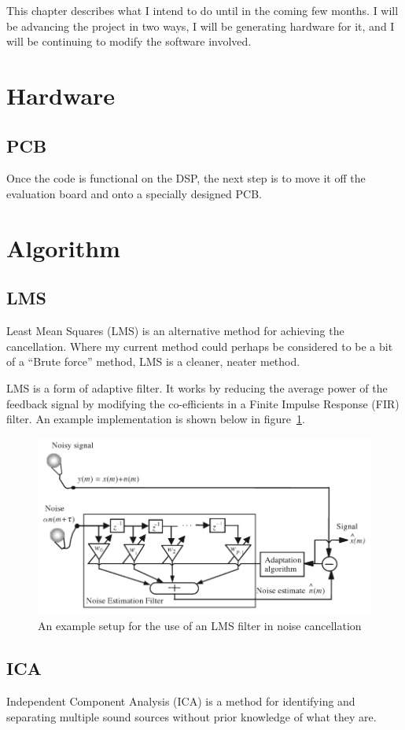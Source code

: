 This chapter describes what I intend to do until in the coming few months.
I will be advancing the project in two ways, I will be generating hardware for it, and I will be continuing to modify the software involved.

\section{Hardware}
\subsection{PCB}
Once the code is functional on the DSP, the next step is to move it off the evaluation board and onto a specially designed PCB.

\section{Algorithm}
\subsection{LMS}
Least Mean Squares (LMS) is an alternative method for achieving the cancellation.
Where my current method could perhaps be considered to be a bit of a ``Brute force'' method, LMS is a cleaner, neater method.

LMS is a form of adaptive filter.
It works by reducing the average power of the feedback signal by modifying the co-efficients in a Finite Impulse Response (FIR) filter.
An example implementation is shown below in figure~\ref{fig:lmsfilter}.

\begin{figure}[H]
	\centering
	\includegraphics[width=\textwidth]{./img/lmsfilter.png}
	\caption{An example setup for the use of an LMS filter in noise cancellation \cite{AdvancedDSPing}}
	\label{fig:lmsfilter}
\end{figure}

\subsection{ICA}
Independent Component Analysis (ICA) is a method for identifying and separating multiple sound sources without prior knowledge of what they are.
